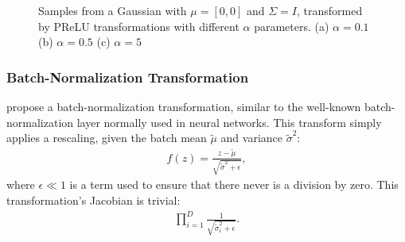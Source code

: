 \begin{figure}[!htb]
  \begin{subfigmatrix}{3}
  \end{subfigmatrix}
    \caption{Samples from a Gaussian with $\mu = [0, 0]$ and $\Sigma = I$, transformed
    by PReLU transformations with different $\alpha$ parameters. (a) $\alpha = 0.1$
    (b) $\alpha = 0.5$ (c) $\alpha = 5$}
  \label{fig:prelu}
\end{figure}

\subsubsection{Batch-Normalization Transformation}
\textcite{real-nvp} propose a batch-normalization transformation, similar to
the well-known batch-normalization layer normally used in neural networks. This
transform simply applies a rescaling, given the batch mean $\tilde\mu$ and variance
${\tilde\sigma}^2$:
\begin{align}
    f(z) = \frac{z - \tilde\mu}{\sqrt{{\tilde\sigma}^2 + \epsilon}},
\end{align} where $\epsilon \ll 1$ is a term used to ensure that there never is
a division by zero. This transformation's Jacobian is trivial: 
\begin{align}
    \prod_{i=1}^D \frac{1}{\sqrt{{\tilde\sigma}_i^2 + \epsilon}}.
\end{align}

